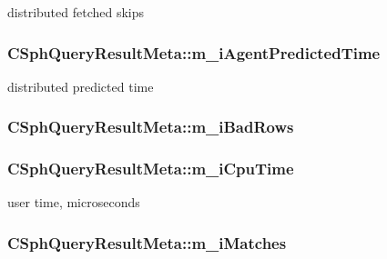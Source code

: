 distributed fetched skips 

\hypertarget{classCSphQueryResultMeta_a744cec6632ca0aa9028b3b8d78989fff}{
\subsubsection[{m\-\_\-i\-Agent\-Predicted\-Time}]{ C\-Sph\-Query\-Result\-Meta\-::m\-\_\-i\-Agent\-Predicted\-Time}}\label{classCSphQueryResultMeta_a744cec6632ca0aa9028b3b8d78989fff}


distributed predicted time 

\hypertarget{classCSphQueryResultMeta_aeda24c2e70479c5ea25df201aa176148}{
\subsubsection[{m\-\_\-i\-Bad\-Rows}]{ C\-Sph\-Query\-Result\-Meta\-::m\-\_\-i\-Bad\-Rows}}\label{classCSphQueryResultMeta_aeda24c2e70479c5ea25df201aa176148}
\hypertarget{classCSphQueryResultMeta_a2d1d0c5cfb53278422774abb9d642984}{
\subsubsection[{m\-\_\-i\-Cpu\-Time}]{ C\-Sph\-Query\-Result\-Meta\-::m\-\_\-i\-Cpu\-Time}}\label{classCSphQueryResultMeta_a2d1d0c5cfb53278422774abb9d642984}


user time, microseconds 

\hypertarget{classCSphQueryResultMeta_ad4a2583024826d59a7970f399f4ce3c8}{
\subsubsection[{m\-\_\-i\-Matches}]{ C\-Sph\-Query\-Result\-Meta\-::m\-\_\-i\-Matches}}\label{classCSphQueryResultMeta_ad4a2583024826d59a7970f399f4ce3c8}


